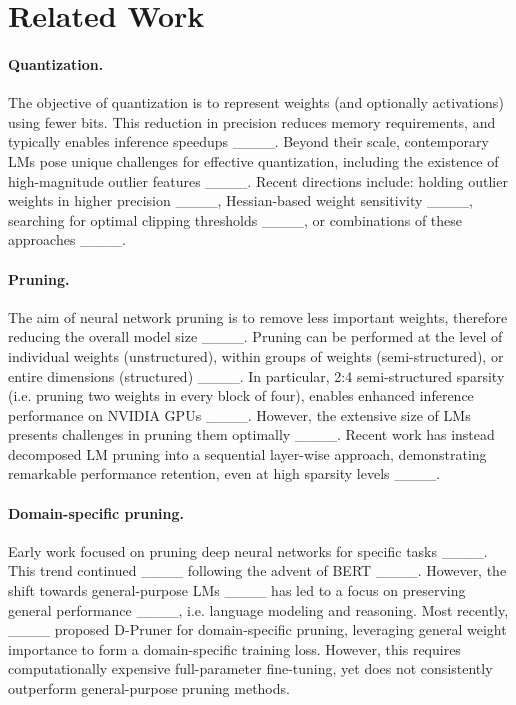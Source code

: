 \section{Related Work}
\paragraph{Quantization.}

The objective of quantization is to represent weights (and optionally activations) using fewer bits. This reduction in precision reduces memory requirements, and typically enables inference speedups ____. Beyond their scale, contemporary LMs pose unique challenges for effective quantization, including the existence of high-magnitude outlier features ____. Recent directions include: holding outlier weights in higher precision ____, Hessian-based weight sensitivity ____, searching for optimal clipping thresholds ____, or combinations of these approaches ____.

\paragraph{Pruning.}

The aim of neural network pruning is to remove less important weights, therefore reducing the overall model size ____. Pruning can be performed at the level of individual weights (unstructured), within groups of weights (semi-structured), or entire dimensions (structured) ____. In particular, 2:4 semi-structured sparsity (i.e. pruning two weights in every block of four), enables enhanced inference performance on NVIDIA GPUs ____. However, the extensive size of LMs presents challenges in pruning them optimally ____. Recent work has instead decomposed LM pruning into a sequential layer-wise approach, demonstrating remarkable performance retention, even at high sparsity levels ____.

\paragraph{Domain-specific pruning.}

Early work focused on pruning deep neural networks for specific tasks ____. This trend continued ____ following the advent of BERT ____. However, the shift towards general-purpose LMs ____ has led to a focus on preserving general performance ____, i.e. language modeling and reasoning. Most recently, ____ proposed D-Pruner for domain-specific pruning, leveraging general weight importance to form a domain-specific training loss. However, this requires computationally expensive full-parameter fine-tuning, yet does not consistently outperform general-purpose pruning methods.

